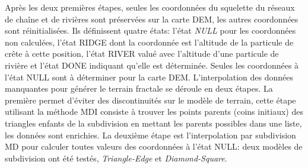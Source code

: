 \documentclass[11pt]{article}
\begin{document}
Après les deux premières étapes, seules les coordonnées du squelette du réseaux de chaîne et de rivières sont préservées sur la carte DEM, les autres coordonnées sont réinitialisées. Ils définissent quatre états: l'état \textit{NULL} pour les coordonnées non calculées, l'état RIDGE dont la coordonnée est l'altitude de la particule de crête à cette position, l'état RIVER valué avec l'altitude d'une particule de rivière et l'état DONE indiquant qu'elle est déterminée. Seules les coordonnées à l'état NULL sont à déterminer pour la carte DEM. L'interpolation des données manquantes pour générer le terrain fractale se déroule en deux étapes. La première permet d'éviter des discontinuités sur le modèle de terrain, cette étape utilisant la méthode MDI consiste à trouver les points parents (coins initiaux) des triangles enfants de la subdivision en mettant les parents possibles dans une liste, les données sont enrichies. La deuxième étape est l'interpolation par subdivision MD pour calculer toutes valeurs des coordonnées à l'état NULL: deux modèles de subdivision ont été testés, \textit{Triangle-Edge} et \textit{Diamond-Square}.
\end{document}
